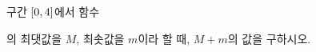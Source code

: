 구간 $[0{,}\mkern3mu\mathopen{}4]$에서 함수 \par\smallskip{}\par\smallskip\noindent 의 최댓값을 $M$, 최솟값을 $m$이라 할 때, $M+m$의 값을 구하시오.
